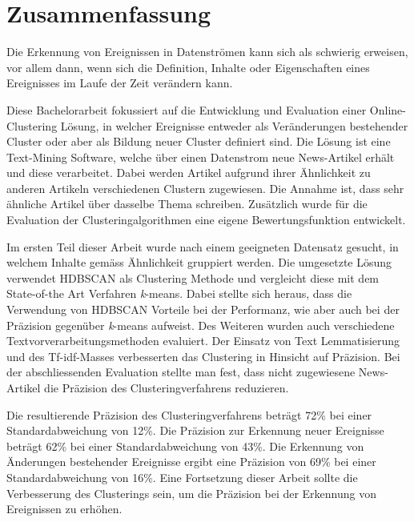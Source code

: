 \section*{Zusammenfassung}
\label{sec:zusammenfassung}

Die Erkennung von Ereignissen in Datenströmen kann sich als schwierig erweisen, vor allem dann,
wenn sich die Definition, Inhalte oder Eigenschaften eines Ereignisses im Laufe der Zeit verändern kann.

Diese Bachelorarbeit fokussiert auf die Entwicklung und Evaluation einer Online-Clustering Lösung,
in welcher Ereignisse entweder als Veränderungen bestehender Cluster oder aber als Bildung neuer Cluster
definiert sind.
Die Lösung ist eine Text-Mining Software, welche über einen Datenstrom neue News-Artikel erhält
und diese verarbeitet.
Dabei werden Artikel aufgrund ihrer Ähnlichkeit zu anderen Artikeln verschiedenen Clustern zugewiesen.
Die Annahme ist, dass sehr ähnliche Artikel über dasselbe Thema schreiben.
Zusätzlich wurde für die Evaluation der Clusteringalgorithmen eine eigene Bewertungsfunktion entwickelt.

Im ersten Teil dieser Arbeit wurde nach einem geeigneten Datensatz gesucht,
in welchem Inhalte gemäss Ähnlichkeit gruppiert werden.
Die umgesetzte Lösung verwendet HDBSCAN als Clustering Methode und vergleicht diese
mit dem State-of-the Art Verfahren \textit{k}-means.
Dabei stellte sich heraus, dass die Verwendung von HDBSCAN Vorteile bei der Performanz,
wie aber auch bei der Präzision gegenüber \textit{k}-means aufweist.
Des Weiteren wurden auch verschiedene Textvorverarbeitungsmethoden evaluiert.
Der Einsatz von Text Lemmatisierung und des Tf-idf-Masses verbesserten
das Clustering in Hinsicht auf Präzision.
Bei der abschliessenden Evaluation stellte man fest,
dass nicht zugewiesene News-Artikel die Präzision des Clusteringverfahrens reduzieren.

Die resultierende Präzision des Clusteringverfahrens beträgt 72\% bei einer Standardabweichung von 12\%.
Die Präzision zur Erkennung neuer Ereignisse beträgt 62\% bei einer Standardabweichung von 43\%.
Die Erkennung von Änderungen bestehender Ereignisse ergibt eine
Präzision von 69\% bei einer Standardabweichung von 16\%.
Eine Fortsetzung dieser Arbeit sollte die Verbesserung des Clusterings sein,
um die Präzision bei der Erkennung von Ereignissen zu erhöhen.
